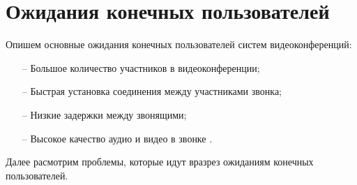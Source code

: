 \section{Ожидания конечных пользователей}

Опишем основные ожидания конечных пользователей систем видеоконференций:
\begin{itemize}
	\item[--] Большое количество участников в видеоконференции;
	\item[--] Быстрая установка соединения между участниками звонка;
	\item[--] Низкие задержки между звонящими;
        \item[--] Высокое качество аудио и видео в звонке \cite{v4}.
\end{itemize}

Далее расмотрим проблемы, которые идут вразрез ожиданиям конечных пользователей.

\pagebreak